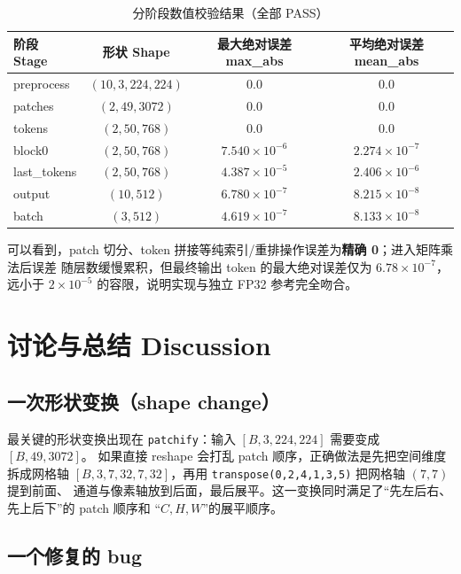 \documentclass[a4paper,12pt]{article}
\begin{document}
\begin{table}[H]
\centering
\begin{tabular}{lccc}
\toprule
阶段 Stage & 形状 Shape & 最大绝对误差 max\_abs & 平均绝对误差 mean\_abs \\
\midrule
preprocess   & $(10,3,224,224)$ & $0.0$          & $0.0$          \\
patches      & $(2,49,3072)$    & $0.0$          & $0.0$          \\
tokens       & $(2,50,768)$     & $0.0$          & $0.0$          \\
block0       & $(2,50,768)$     & $7.540\times10^{-6}$ & $2.274\times10^{-7}$ \\
last\_tokens & $(2,50,768)$     & $4.387\times10^{-5}$ & $2.406\times10^{-6}$ \\
output       & $(10,512)$       & $6.780\times10^{-7}$ & $8.215\times10^{-8}$ \\
batch        & $(3,512)$        & $4.619\times10^{-7}$ & $8.133\times10^{-8}$ \\
\bottomrule
\end{tabular}
\caption{分阶段数值校验结果（全部 PASS）}
\label{tab:errors}
\end{table}

可以看到，patch 切分、token 拼接等纯索引/重排操作误差为\textbf{精确 0}；进入矩阵乘法后误差
随层数缓慢累积，但最终输出 token 的最大绝对误差仅为 $6.78\times10^{-7}$，远小于
$2\times10^{-5}$ 的容限，说明实现与独立 FP32 参考完全吻合。

\section{讨论与总结 Discussion}

\subsection{一次形状变换（shape change）}

最关键的形状变换出现在 \texttt{patchify}：输入 $[B,3,224,224]$ 需要变成 $[B,49,3072]$。
如果直接 reshape 会打乱 patch 顺序，正确做法是先把空间维度拆成网格轴
$[B,3,7,32,7,32]$，再用 \texttt{transpose(0,2,4,1,3,5)} 把网格轴 $(7,7)$ 提到前面、
通道与像素轴放到后面，最后展平。这一变换同时满足了“先左后右、先上后下”的 patch 顺序和
“$C,H,W$”的展平顺序。

\subsection{一个修复的 bug}
\end{document}
